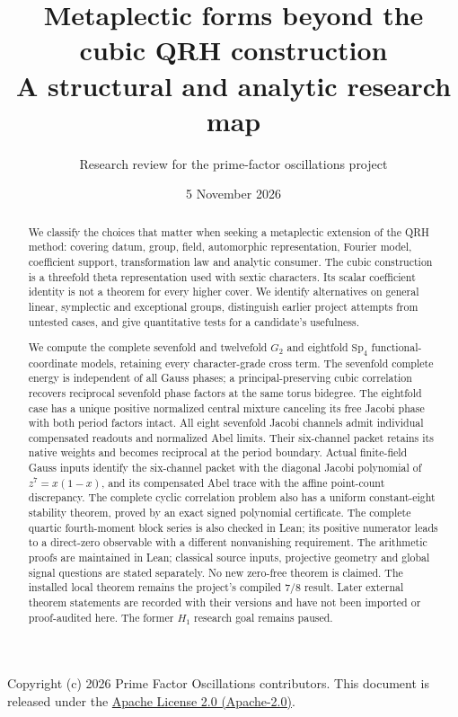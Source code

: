 \documentclass[11pt]{article}
\title{Metaplectic forms beyond the cubic QRH construction\\
\large A structural and analytic research map}
\author{Research review for the prime-factor oscillations project}
\date{5 November 2026}
\newcommand{\Sp}{\mathrm{Sp}}
\begin{document}
\maketitle
{\small Copyright (c) 2026 Prime Factor Oscillations contributors.
This document is released under the
\href{https://www.apache.org/licenses/LICENSE-2.0}{Apache License 2.0 (Apache-2.0)}.}
\begin{abstract}
We classify the choices that matter when seeking a metaplectic extension
of the QRH method: covering datum, group, field, automorphic representation,
Fourier model, coefficient support, transformation law and analytic consumer.
The cubic construction is a threefold theta representation used with sextic
characters. Its scalar coefficient identity is not a theorem for every
higher cover. We identify alternatives on general linear, symplectic and
exceptional groups, distinguish earlier project attempts from untested
cases, and give quantitative tests for a candidate's usefulness.

We compute the complete sevenfold and twelvefold $G_2$ and eightfold
$\Sp_4$ functional-coordinate models, retaining every character-grade
cross term. The sevenfold complete energy is independent of all Gauss
phases; a principal-preserving cubic correlation recovers reciprocal
sevenfold phase factors at the same torus bidegree. The eightfold case
has a unique positive normalized central mixture canceling its free
Jacobi phase with both period factors intact.
All eight sevenfold Jacobi channels admit individual compensated
readouts and normalized Abel limits. Their six-channel packet retains
its native weights and becomes reciprocal at the period boundary.
Actual finite-field Gauss inputs identify the six-channel packet
with the diagonal Jacobi polynomial of $z^7=x(1-x)$, and its compensated
Abel trace with the affine point-count discrepancy.
The complete cyclic correlation problem also has a uniform constant-eight
stability theorem, proved by an exact signed polynomial certificate.
The complete quartic fourth-moment block series is also checked in Lean;
its positive numerator leads to a direct-zero observable with a different
nonvanishing requirement.
The arithmetic proofs are maintained in Lean; classical source inputs,
projective geometry and global signal questions are stated separately.
No new zero-free theorem is claimed. The installed local theorem remains
the project's compiled $7/8$ result. Later external theorem statements are
recorded with their versions and have not been imported or proof-audited
here. The former $H_1$ research goal remains paused.
\end{abstract}
\tableofcontents
\end{document}
